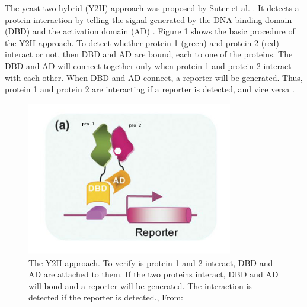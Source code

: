The yeast two-hybrid (Y2H) approach was proposed by Suter et al. \cite{fields1989novel}. It detects a protein interaction by telling the signal generated by the DNA-binding domain (DBD) and the activation domain (AD) \cite{suter2008two}. Figure \ref{E_M1} shows the basic procedure of the Y2H approach. To detect whether protein 1 (green) and protein 2 (red) interact or not, then DBD and AD are bound, each to one of the proteins. The DBD and AD will connect together only when protein 1 and protein 2 interact with each other. When DBD and AD connect, a reporter will be generated. Thus, protein 1 and protein 2 are interacting if a reporter is detected, and vice versa \cite{suter2008two}.
\begin{figure}[h!]
\begin{center}
\includegraphics[height =7 cm, width = 9cm]{img/E_M1.jpg}
\caption[The Y2H approach]{The Y2H approach. To verify is protein 1 and 2 interact, DBD and AD are attached to them. If the two proteins interact, DBD and AD will bond and a reporter will be generated. The interaction is detected if the reporter is detected., From: \cite{suter2008two} \label{E_M1}}
\end{center}
\end{figure}

